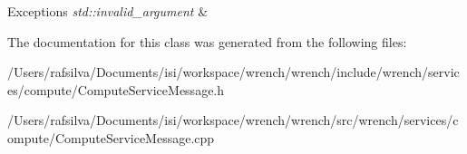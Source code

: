 \begin{DoxyExceptions}{Exceptions}
{\em std\+::invalid\+\_\+argument} & \\
\hline
\end{DoxyExceptions}


The documentation for this class was generated from the following files\+:\begin{DoxyCompactItemize}
\item 
/\+Users/rafsilva/\+Documents/isi/workspace/wrench/wrench/include/wrench/services/compute/Compute\+Service\+Message.\+h\item 
/\+Users/rafsilva/\+Documents/isi/workspace/wrench/wrench/src/wrench/services/compute/Compute\+Service\+Message.\+cpp\end{DoxyCompactItemize}
